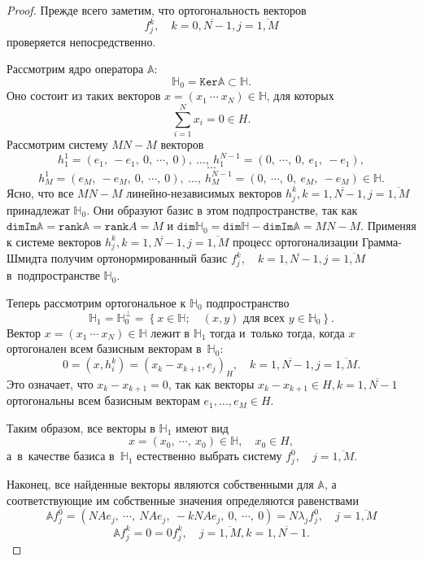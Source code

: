 \documentclass[a4paper]{article}
\begin{document}
 \begin{proof}
     Прежде всего заметим, что ортогональность векторов
     \[ f_j^k, \quad k=\overline{0,N-1}, j=\overline{1,M} \]
     проверяется непосредственно.

     Рассмотрим ядро оператора \( \mathbb{A} \):
     \[ \mathbb{H}_0 = \mathtt{Ker}\mathbb{A} \subset \mathbb{H}. \]
     Оно состоит из таких векторов \( x = (x_1 ~\cdots~ x_N) \in \mathbb{H} \),
     для которых \[ \sum_{i=1}^N x_i = 0 \in H. \]
     Рассмотрим систему \( MN - M \) векторов
     \[ h_1^1 = ( e_1, ~ -e_1, ~ 0, ~\cdots, ~ 0), ~ \ldots, ~ h_1^{N-1} = (0, ~\cdots,~ 0, ~ e_1, ~ -e_1), \]
     \[ \cdots \]
     \[ h_M^1 = ( e_M, ~ -e_M, ~ 0, ~\cdots, ~ 0), ~ \ldots, ~ h_M^{N-1} = (0, ~\cdots,~ 0, ~ e_M, ~ -e_M) \in \mathbb{H}. \]
     Ясно, что все \( MN - M \) линейно-независимых векторов
     \( h_j^k, k=\overline{1,N-1},j=\overline{1,M} \)
     принадлежат \( \mathbb{H}_0 \).
     Они образуют базис в этом подпространстве, так как
     \( \mathtt{dim}\mathtt{Im}\mathbb{A} = \mathtt{rank}\mathbb{A} = \mathtt{rank}A = M \)
     и \( \mathtt{dim}\mathbb{H}_0 = \mathtt{dim}\mathbb{H} - \mathtt{dim}\mathtt{Im}\mathbb{A} = MN - M \).
     Применяя к системе векторов \( h_j^k, k=\overline{1,N-1},j=\overline{1,M} \) процесс ортогонализации Грамма-Шмидта
     получим ортонормированный базис \( f_j^k, \quad k=\overline{1,N-1},j=\overline{1,M}\) в~подпространстве \( \mathbb{H}_0 \).

     Теперь рассмотрим ортогональное к \( \mathbb{H}_0 \) подпространство
     \[ \mathbb{H}_1 = \mathbb{H}_0^\perp = \left\{ x\in\mathbb{H};\quad (x,y) \text{ для всех } y\in\mathbb{H}_0 \right\}. \]
     Вектор \( x=(x_1 ~\cdots~ x_N)\in\mathbb{H} \) лежит в \( \mathbb{H}_1 \)
     тогда и~только тогда, когда
     \( x \) ортогонален всем базисным векторам в~\( \mathbb{H}_0 \):
     \[ 0 = (x,h_i^k) = (x_k - x_{k+1}, e_j)_H, \quad k=\overline{1,N-1}, j=\overline{1,M}. \]
     Это означает, что \( x_k - x_{k+1} = 0 \), так как векторы \( x_k - x_{k+1} \in H, k=\overline{1,N-1} \)
     ортогональны всем базисным векторам \( e_1, \ldots, e_M \in H \).

     Таким образом, все векторы в \( \mathbb{H}_1 \) имеют вид
     \[ x = (x_0, ~\cdots, ~ x_0)\in\mathbb{H}, \quad x_0\in H, \]
     а~в~качестве базиса в~\( \mathbb{H}_1 \) естественно выбрать
     систему \( f_j^0, \quad j=\overline{1,M} \).

     Наконец, все найденные векторы являются собственными для \( \mathbb{A} \),
     а соответствующие им собственные значения определяются равенствами
     \[ \mathbb{A} f_j^0 = ( N A e_j, ~ \cdots, ~ NA e_j, ~ -kNAe_j, ~ 0, ~ \cdots, ~ 0 ) = N\lambda_j f_j^0, \quad j=\overline{1,M} \]
     \[ \mathbb{A} f_j^k = 0 = 0 f_j^k, \quad j=\overline{1,M}, k=\overline{1,N-1}. \]
 \end{proof}
\end{document}
